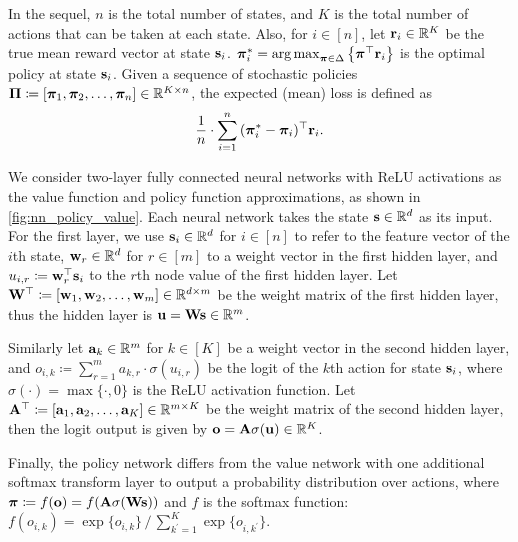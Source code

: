 In the sequel, $n$ is the total number of states, and $K$ is the total number of actions that can be taken at each state.
Also, for $i\in[n]$, let ${\mathbf{r}}_i \in {\mathbb{R}}^K$ be the true mean reward vector at state ${\mathbf{s}}_i$. ${\boldsymbol{\pi}}_i^* = \operatorname*{arg\,max}_{{\boldsymbol{\pi}} \in \Delta}{\left\{ {\boldsymbol{\pi}}^\top {\mathbf{r}}_i \right\}}$ is the optimal policy at state ${\mathbf{s}}_i$. Given a sequence of stochastic policies $\mathbf{\Pi} \coloneqq \left[ {\boldsymbol{\pi}}_1, {\boldsymbol{\pi}}_2, \dots, {\boldsymbol{\pi}}_n \right] \in {{\mathbb{R}}}^{K \times n}$, the expected (mean) loss is defined as
\begin{equation}
\label{eq:expected_loss}
\begin{split}
\frac{1}{n} \cdot \sum\limits_{i=1}^{n}{ ( {{\boldsymbol{\pi}}_i^*} - {\boldsymbol{\pi}}_i) ^\top {\mathbf{r}}_i }.
\end{split}
\end{equation}

We consider two-layer fully connected neural networks with ReLU activations as the value function and policy function approximations, as shown in \cref{fig:nn_policy_value}. 
Each neural network takes the state ${\mathbf{s}} \in {\mathbb{R}}^d$ as its input.
For the first layer, we use ${\mathbf{s}}_i \in {\mathbb{R}}^d$ for $i \in [n]$ to refer to the feature vector of the $i$th state, ${\mathbf{w}}_r \in {\mathbb{R}}^d$ for $r \in [m]$ to a weight vector in the first hidden layer, and $u_{i,r} \coloneqq {\mathbf{w}}_r^\top {\mathbf{s}}_i$ to the $r$th node value of the first hidden layer.
Let ${\mathbf{W}}^\top \coloneqq \left[ {\mathbf{w}}_1, {\mathbf{w}}_2, \dots, {\mathbf{w}}_m \right] \in {\mathbb{R}}^{d \times m}$ be the weight matrix of the first hidden layer, thus the hidden layer is ${\mathbf{u}} = {\mathbf{W}}{\mathbf{s}}\in{\mathbb{R}}^m$.

Similarly let ${\mathbf{a}}_k \in {\mathbb{R}}^m$ for $k \in [K]$ be a weight vector in the second hidden layer, and $o_{i,k} \coloneqq \sum_{r=1}^{m}{a_{k,r} \cdot \sigma\left( u_{i,r} \right)}$ be the logit of the $k$th action for state ${\mathbf{s}}_i$, where $\sigma(\cdot) = \max\{ \cdot, 0 \}$ is the ReLU activation function. 
Let ${\mathbf{A}}^\top \coloneqq \left[ {\mathbf{a}}_1, {\mathbf{a}}_2, \dots, {\mathbf{a}}_K \right] \in {\mathbb{R}}^{m \times K}$ be the weight matrix of the second hidden layer, then the logit output is given by ${\mathbf{o}} = {\mathbf{A}}\sigma( {\mathbf{u}}) \in {\mathbb{R}}^K$.

Finally, the policy network differs from the value network with one additional softmax transform layer to output a probability distribution over actions, where ${\boldsymbol{\pi}} \coloneqq f( {\mathbf{o}} ) = f( {\mathbf{A}} \sigma( {\mathbf{W}} {\mathbf{s}} ) )$ and $f$ is the softmax function: $f( o_{i,k} ) = \exp\{ o_{i,k} \} \,/\, \sum_{k^\prime = 1}^{K}{\exp\{ o_{i,k^\prime} \}}$.
